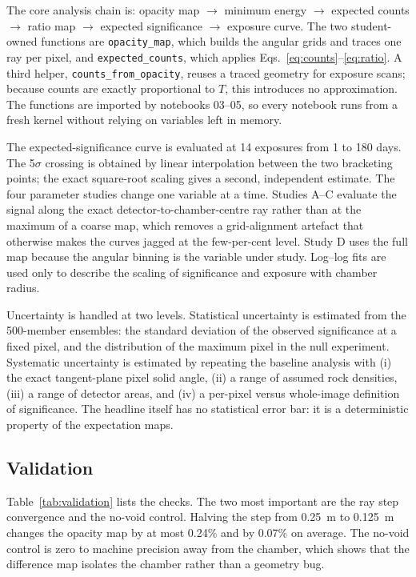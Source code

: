 \documentclass{article}
\begin{document}
The core analysis chain is: opacity map $\rightarrow$ minimum energy
$\rightarrow$ expected counts $\rightarrow$ ratio map $\rightarrow$ expected
significance $\rightarrow$ exposure curve. The two student-owned functions are
\texttt{opacity\_map}, which builds the angular grids and traces one ray per
pixel, and \texttt{expected\_counts}, which applies
Eqs.~\eqref{eq:counts}--\eqref{eq:ratio}. A third helper,
\texttt{counts\_from\_opacity}, reuses a traced geometry for exposure scans;
because counts are exactly proportional to $T$, this introduces no
approximation. The functions are imported by notebooks 03--05, so every
notebook runs from a fresh kernel without relying on variables left in memory.

The expected-significance curve is evaluated at 14 exposures from 1 to 180 days.
The 5$\sigma$ crossing is obtained by linear interpolation between the two
bracketing points; the exact square-root scaling gives a second, independent
estimate. The four parameter studies change one variable at a time. Studies
A--C evaluate the signal along the exact detector-to-chamber-centre ray rather
than at the maximum of a coarse map, which removes a grid-alignment artefact
that otherwise makes the curves jagged at the few-per-cent level. Study D uses
the full map because the angular binning is the variable under study. Log--log
fits are used only to describe the scaling of significance and exposure with
chamber radius.

Uncertainty is handled at two levels. Statistical uncertainty is estimated from
the 500-member ensembles: the standard deviation of the observed significance
at a fixed pixel, and the distribution of the maximum pixel in the null
experiment. Systematic uncertainty is estimated by repeating the baseline
analysis with (i) the exact tangent-plane pixel solid angle, (ii) a range of
assumed rock densities, (iii) a range of detector areas, and (iv) a per-pixel
versus whole-image definition of significance. The headline itself has no
statistical error bar: it is a deterministic property of the expectation maps.

\subsection{Validation}

Table~\ref{tab:validation} lists the checks. The two most important are the ray
step convergence and the no-void control. Halving the step from 0.25~m to
0.125~m changes the opacity map by at most 0.24\% and by 0.07\% on average. The
no-void control is zero to machine precision away from the chamber, which shows
that the difference map isolates the chamber rather than a geometry bug.
\end{document}

